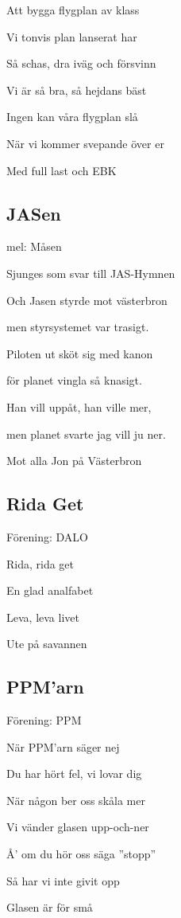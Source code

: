Att bygga flygplan av klass

Vi tonvis plan lanserat har

Så schas, dra iväg och försvinn

Vi är så bra, så hejdans bäst

Ingen kan våra flygplan slå

När vi kommer svepande över er

Med full last och EBK\bigskip

\subsection{\textbf{JASen}}

mel: Måsen

Sjunges som svar till JAS-Hymnen\bigskip

Och Jasen styrde mot västerbron

men styrsystemet var trasigt.

Piloten ut sköt sig med kanon

för planet vingla så knasigt.

Han vill uppåt, han ville mer,

men planet svarte jag vill ju ner.

Mot alla Jon på Västerbron 

\subsection{\textbf{Rida Get}}

Förening: DALO

Rida, rida get

En glad analfabet

Leva, leva livet

Ute på savannen\bigskip

\subsection{\textbf{PPM'arn}}

Förening: PPM

När PPM’arn säger nej

Du har hört fel, vi lovar dig

När någon ber oss skåla mer

Vi vänder glasen upp-och-ner

Å’ om du hör oss säga ”stopp”

Så har vi inte givit opp

Glasen är för små


